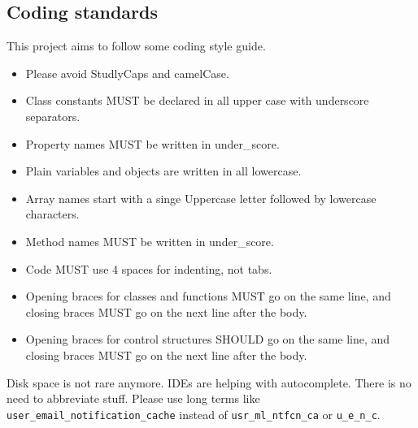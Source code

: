 \subsection{Coding standards}
This project aims to follow some coding style guide.
\begin{itemize}
\item Please avoid StudlyCaps and camelCase.
\item Class constants MUST be declared in all upper case with underscore separators.
\item Property names MUST be written in under{\_}score.
\item Plain variables and objects are written in all lowercase.
\item Array names start with a singe Uppercase letter followed by lowercase characters.
\item Method names MUST be written in under{\_}score.

\item Code MUST use 4 spaces for indenting, not tabs.
\item Opening braces for classes and functions MUST go on the same line, and closing braces MUST go on the next line after the body.
\item Opening braces for control structures SHOULD go on the same line, and closing
braces MUST go on the next line after the body.
\end{itemize}
Disk space is not rare anymore. IDEs are helping with autocomplete. There is no need to abbreviate stuff. Please use long terms like \lstinline|user_email_notification_cache| instead of \lstinline|usr_ml_ntfcn_ca| or \lstinline|u_e_n_c|.

